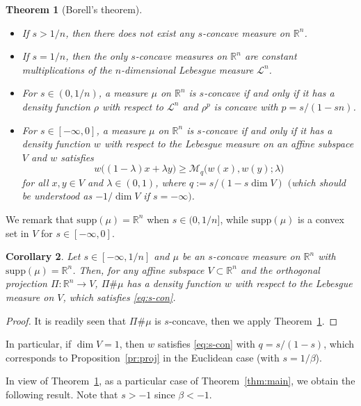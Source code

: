 \documentclass[sts]{imsart}
\newtheorem{theorem}{Theorem}[section]
\newtheorem{corollary}[theorem]{Corollary}
\theoremstyle{definition}
\theoremstyle{remark}
\newcommand{\R}{\mathbb{R}}
\newcommand{\lra}{\longrightarrow}
\newcommand{\supp}{\mathrm{supp}}
\begin{document}
\begin{theorem}[Borell's theorem]\label{th:Borell}
\begin{itemize}
    \item If $s>1/n$, then there does not exist any $s$-concave measure on $\R^n$.
    \item If $s=1/n$, then the only $s$-concave measures on $\R^n$ are constant multiplications of the $n$-dimensional Lebesgue measure $\mathcal{L}^n$.
    \item For $s \in (0,1/n)$, a measure $\mu$ on $\R^n$ is $s$-concave if and only if it has a density function $\rho$ with respect to $\mathcal{L}^n$ and $\rho^p$ is concave with $p=s/(1-sn)$.
    \item For $s\in [-\infty,0]$, a measure $\mu$ on $\R^n$ is $s$-concave if and only if it has a density function $w$ with respect to the Lebesgue measure on an affine subspace $V$ and $w$ satisfies
    \begin{equation}\label{eq:s-con}
    w\bigl( (1-\lambda) x +\lambda y \bigr)
    \ge \mathcal{M}_q\bigl( w(x),w(y);\lambda \bigr)
    \end{equation}
    for all $x,y \in V$ and $\lambda \in (0,1)$, where $q:=s/(1-s\dim V)$ $($which should be understood as $-1/\dim V$ if $s=-\infty)$.
\end{itemize}
\end{theorem}

We remark that $\supp(\mu)=\R^n$ when $s \in (0,1/n]$, while $\supp(\mu)$ is a convex set in $V$ for $s \in [-\infty,0]$.

\begin{corollary}
    Let $s\in [-\infty,1/n]$ and $\mu$ be an $s$-concave measure on $\R^n$ with $\supp(\mu)=\R^n$.
    Then, for any affine subspace $V \subset \R^n$ and the orthogonal projection $\Pi\colon \R^n \lra V$,
    $\Pi\#\mu$ has a density function $w$ with respect to the Lebesgue measure on $V$, which satisfies \eqref{eq:s-con}. 
\end{corollary}

\begin{proof}
    It is readily seen that $\Pi\#\mu$ is $s$-concave,
    then we apply Theorem~\ref{th:Borell}.
\end{proof}

In particular, if $\dim V=1$, then $w$ satisfies \eqref{eq:s-con} with $q=s/(1-s)$, which corresponds to Proposition~\ref{pr:proj} in the Euclidean case (with $s=1/\beta$).

In view of Theorem~\ref{th:Borell},
as a particular case of Theorem~\ref{thm:main}, we obtain the following result.
Note that $s>-1$ since $\beta<-1$.
\end{document}
